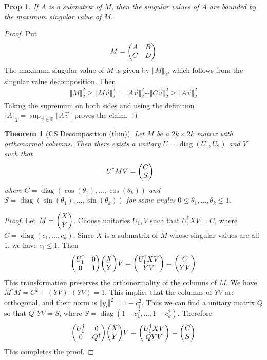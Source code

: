 \documentclass[11pt]{article}
\newtheorem{prop}{Prop}
\newtheorem{thm}{Theorem}
\newcommand{\diag}{\operatorname{diag}}
\begin{document}
\begin{prop}
If $A$ is a submatrix of $M$, then the singular values of $A$ are bounded by the maximum singular value of $M$.
\end{prop}
\begin{proof}
Put
$$
M = \mqty(A & B \\ C & D)
$$
The maximum singular value of $M$ is given by $\Vert M \Vert_2$, which follows from the singular value decomposition. Then
\begin{align}
    \Vert M \Vert_2^2 \geq \Vert M \vec v\Vert_2^2 = \Vert A \vec v \Vert_2^2 + \Vert C \vec v \Vert_2^2 \geq \Vert A \vec v \Vert_2^2
\end{align}
Taking the supremum on both sides and using the definition $\Vert A \Vert_2 = \sup_{\vec v \in \mathbb B}\Vert A\vec v \Vert$ proves the claim.
\end{proof}

\begin{thm}[CS Decomposition (thin)]
Let $M$ be a $2k \times 2k$ matrix with orthonormal columns. Then there exists a unitary $U = \diag(U_1, U_2)$ and $V$ such that
\begin{align}
    U^\dagger M V &= \mqty(C \\ S)
\end{align}
where $C = \diag(\cos(\theta_1), \dots, \cos(\theta_k))$ and $S = \diag(\sin(\theta_1), \dots, \sin(\theta_k))$ for some angles $0 \leq \theta_1, \dots, \theta_k \leq 1$. 
\end{thm}

\begin{proof}
Let $M = \mqty(X \\ Y)$. Choose unitaries $U_1, V$ such that $U_1^\dagger X V = C$, where $C = \diag(c_1, \dots, c_k)$. Since $X$ is a submatrix of $M$ whose singular values are all 1, we have $c_i \leq 1$. Then
$$
\mqty(U_1^\dagger & 0 \\ 0 & 1)\mqty(X \\ Y)V = \mqty(U_1^\dagger X V \\ YV) = \mqty(C \\ YV)
$$
This transformation preserves the orthonormality of the columns of $M$. We have $M^\dagger M = C^2 + (YV)^\dagger (YV)  = 1$. This implies that the columns of $YV$ are orthogonal, and their norm is $\Vert y_i \Vert^2 = 1-c_i^2$. Thus we can find a unitary matrix $Q$ so that $Q^\dagger YV = S$, where $S = \diag(1-c_1^2, \dots, 1-c_k^2)$. Therefore
$$
\mqty(U_1^\dagger & 0 \\ 0 & Q^\dagger)\mqty(X \\ Y)V = \mqty(U_1^\dagger X V \\ QYV) = \mqty(C \\ S)
$$
This completes the proof.
\end{proof}
\end{document}
